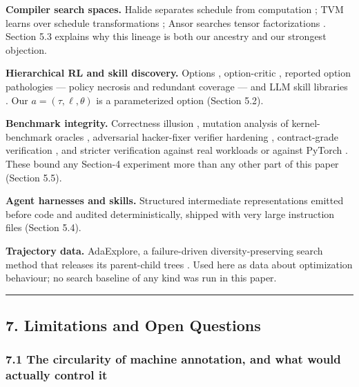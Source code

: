 \documentclass[
  11pt,
]{article}
\begin{document}
\textbf{Compiler search spaces.} Halide separates schedule from computation \cite{halide8}; TVM learns over schedule transformations \cite{tvm9}; Ansor searches tensor factorizations \cite{ansor10}. Section 5.3 explains why this lineage is both our ancestry and our strongest objection.

\textbf{Hierarchical RL and skill discovery.} Options \cite{between11}, option-critic \cite{the12}, reported option pathologies --- policy necrosis and redundant coverage \cite{when13} --- and LLM skill libraries \cite{voyager14}. Our \(a = (\tau, \ell, \theta)\) is a parameterized option (Section 5.2).

\textbf{Benchmark integrity.} Correctness illusion \cite{the20}, mutation analysis of kernel-benchmark oracles \cite{measuring24}, adversarial hacker-fixer verifier hardening \cite{hardening19}, contract-grade verification \cite{a21}, and stricter verification against real workloads or against PyTorch \cite{kernelbenchverified22,are23,how25}. These bound any Section-4 experiment more than any other part of this paper (Section 5.5).

\textbf{Agent harnesses and skills.} Structured intermediate representations emitted before code and audited deterministically, shipped with very large instruction files \cite{flashrt28} (Section 5.4).

\textbf{Trajectory data.} AdaExplore, a failure-driven diversity-preserving search method that releases its parent-child trees \cite{adaexplore3}. Used here as data about optimization behaviour; no search baseline of any kind was run in this paper.

\begin{center}\rule{0.5\linewidth}{0.5pt}\end{center}

\hypertarget{limitations-and-open-questions}{%
\subsection{7. Limitations and Open Questions}\label{limitations-and-open-questions}}

\hypertarget{the-circularity-of-machine-annotation-and-what-would-actually-control-it}{%
\subsubsection{7.1 The circularity of machine annotation, and what would actually control it}\label{the-circularity-of-machine-annotation-and-what-would-actually-control-it}}
\end{document}
